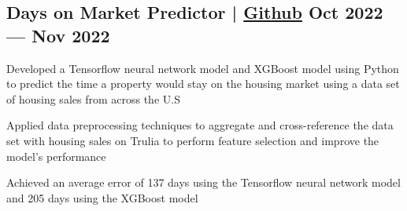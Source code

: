 \subsection{{Days on Market Predictor | \href{https://github.com/jerikjakobsen/Days-on-Market-Predictor}{Github} \hfill Oct 2022 --- Nov 2022}}
\begin{zitemize}
\item Developed a Tensorflow neural network model and XGBoost model using Python to predict the time a property would stay on the housing market using a data set of housing sales from across the U.S
\item Applied data preprocessing techniques to aggregate and cross-reference the data set with housing sales on Trulia to perform feature selection and improve the model’s performance
\item Achieved an average error of 137 days using the Tensorflow neural network model and 205 days using the XGBoost model
\end{zitemize}


